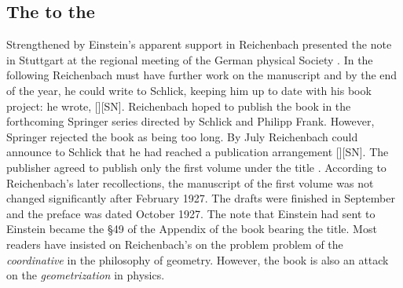 \documentclass[draft]{article}
\newcommand{\PRZL}{\citetitle{Reichenbach1928}\xspace}
\newcommand{\Reich}{Reichenbach\xspace}
\begin{document}

\subsection{The \Ap to the \PRZL}

Strengthened by Einstein's apparent support in  Reichenbach presented the note in Stuttgart at the regional meeting of the German physical Society \citep{Reichenbach1926d}. In the following Reichenbach must have further work on the manuscript and by the end of the year, he could write to Schlick, keeping him up to date with his book project:  he wrote,  [][SN]\label{RZL1926}. Reichenbach hoped to publish the book in the forthcoming Springer series  directed by Schlick and Philipp Frank. However, Springer rejected the book as being too long. By July Reichenbach could announce to Schlick that he had reached a publication arrangement [][SN]. The publisher agreed to publish only the first volume under the title . According to \Reich's later recollections, the manuscript of the first volume was not changed significantly after February 1927. The drafts were finished in September and the preface was dated October 1927. The note that Einstein had sent to Einstein became the \S49 of the Appendix of the book bearing the title. Most readers have insisted on Reichenbach's on the problem problem of the \emph{coordinative} in the philosophy of geometry. However, the book is also an attack on the \emph{geometrization} in physics.

\end{document}
